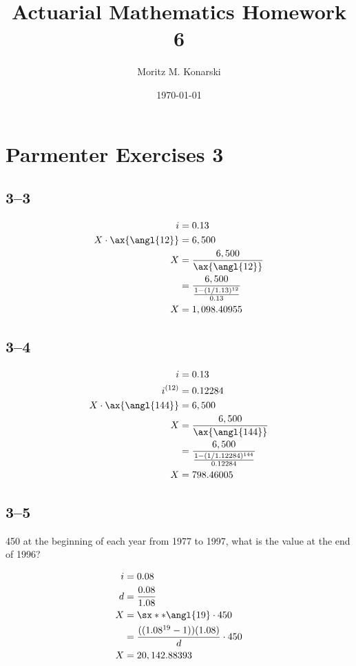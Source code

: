 \documentclass[a4paper, 12pt, reqno]{amsart}
\title{Actuarial Mathematics Homework 6}
\author{Moritz M. Konarski}
\date{\today}
\numberwithin{equation}{section}
\begin{document}
\maketitle

\section*{Parmenter Exercises 3}

\subsection*{3--3}

\begin{equation}\nonumber
    \begin{aligned}
        i &= 0.13 \\
        X \cdot \ax{\angl{12}} &= 6,500 \\
        X &= \frac{6,500}{\ax{\angl{12}}}  \\
          &= \frac{6,500}{\frac{1 - (1/1.13)^{12}}{0.13}}  \\
        X &= 1,098.40955 
    \end{aligned}
\end{equation}

\subsection*{3--4}

\begin{equation}\nonumber
    \begin{aligned}
        i &= 0.13 \\
        i^{(12)} &= 0.12284 \\
        X \cdot \ax{\angl{144}} &= 6,500 \\
        X &= \frac{6,500}{\ax{\angl{144}}}  \\
          &= \frac{6,500}{\frac{1 - (1/1.12284)^{144}}{0.12284}}  \\
        X &= 798.46005
    \end{aligned}
\end{equation}

\subsection*{3--5}

450 at the beginning of each year from 1977 to 1997, what is the value at the
end of 1996?

\begin{equation}\nonumber
    \begin{aligned}
        i &= 0.08 \\
        d &= \frac{0.08}{1.08}  \\
        X &= \sx**{\angl{19}} \cdot 450  \\
          &= \frac{((1.08^{19} - 1))(1.08)}{d} \cdot 450 \\
        X &= 20,142.88393
    \end{aligned}
\end{equation}
\end{document}
